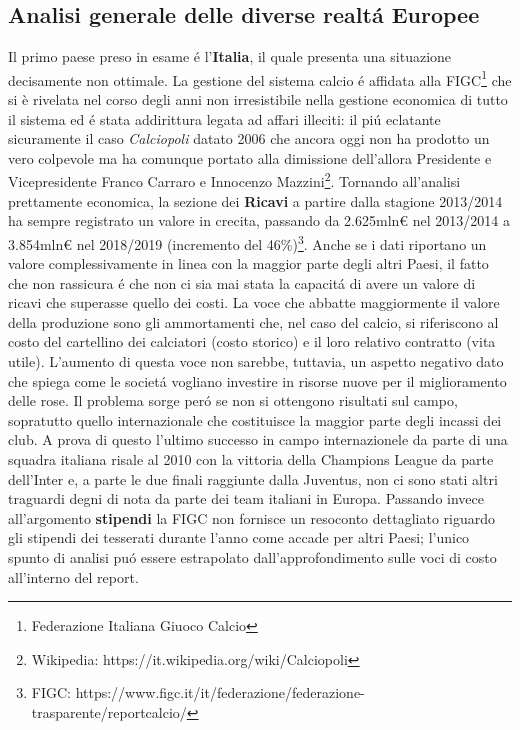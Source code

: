 \documentclass[
    corpo=12pt,
    oneside,
    evenboxes,
    tipotesi=triennale,
    stile=classica,
    oldstyle,
    autoretitolo,
    greek,
]{toptesi}
\begin{document}
\begin{interlinea}{1.5}
\section{Analisi generale delle diverse realt\'a Europee}
Il primo paese preso in esame \'e l'\textbf{Italia}, il quale presenta una situazione decisamente non ottimale. La gestione del sistema calcio 
\'e affidata alla FIGC\footnote{Federazione Italiana Giuoco Calcio} che si è rivelata nel corso degli anni non irresistibile nella gestione economica
di tutto il sistema ed \'e stata addirittura legata ad affari illeciti: il pi\'u eclatante sicuramente il caso \emph{Calciopoli} 
datato 2006 che ancora oggi non ha prodotto un vero colpevole ma ha comunque portato alla dimissione dell'allora Presidente e 
Vicepresidente Franco Carraro e Innocenzo Mazzini\footnote{Wikipedia: https://it.wikipedia.org/wiki/Calciopoli}.
Tornando all'analisi prettamente economica, la sezione dei \textbf{Ricavi} a partire dalla stagione 2013/2014 ha sempre registrato un valore 
in crecita, passando da 2.625mln€ nel 2013/2014 a 3.854mln€ nel 2018/2019 (incremento del 46\%)\footnote{FIGC: https://www.figc.it/it/federazione/federazione-trasparente/reportcalcio/}. 
Anche se i dati riportano un valore complessivamente in linea con la maggior parte degli altri Paesi, il fatto che non rassicura \'e che non
ci sia mai stata la capacit\'a di avere un valore di ricavi che superasse quello dei costi. La voce che abbatte maggiormente il valore 
della produzione sono gli ammortamenti che, nel caso del calcio, 
si riferiscono al costo del cartellino dei calciatori (costo storico) e il loro relativo contratto (vita utile). L'aumento di questa voce
non sarebbe, tuttavia, un aspetto negativo dato che spiega come le societ\'a vogliano investire in risorse nuove per il miglioramento delle
rose. Il problema sorge per\'o se non si ottengono risultati sul campo, sopratutto quello internazionale che costituisce la maggior parte
degli incassi dei club. A prova di questo l'ultimo successo in campo 
internazionele da parte di una squadra italiana risale al 2010 con la vittoria della Champions League da parte dell'Inter e, a parte
le due finali raggiunte dalla Juventus, non ci sono stati altri traguardi degni di nota da parte dei team italiani in Europa.\newline
Passando invece all'argomento \textbf{stipendi} la FIGC non fornisce un resoconto \linebreak dettagliato riguardo gli stipendi dei tesserati durante l'anno
come accade per altri Paesi; l'unico spunto di analisi pu\'o essere estrapolato dall'approfondimento sulle voci di costo all'interno del report.

\end{interlinea}
\end{document}
